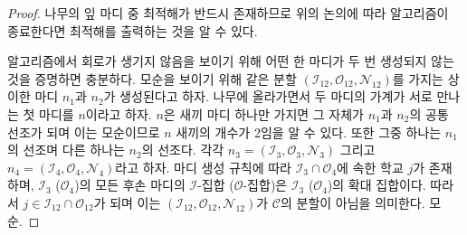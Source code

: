 \documentclass[11pt]{article} %
\newif\ifen
\theoremstyle{definition}
\theoremstyle{definition}
\begin{document}
\begin{proof}
\ifen
Because an optimal solution exists among the leaves of the tree, the discussion above implies that as long as the algorithm terminates, it returns an optimal solution.

To show that the algorithm does not cycle, it suffices to show that no node is generated twice. Suppose not: that two distinct nodes $n_1$ and $n_2$ share the same partition $(\mathcal{I}_{12}, \mathcal{O}_{12}, \mathcal{N}_{12})$. Trace each node's lineage up the tree and let $n$ denote the \emph{first} node at which the lineages meet. $n$ must have two children, or else its sole child is a common ancestor of $n_1$ and $n_2$, and one of these children, say $n_3$, must be an ancestor of $n_1$ while the other, say $n_4$, is an ancestor of $n_2$.  Write $n_3 = (\mathcal{I}_{3}, \mathcal{O}_{3}, \mathcal{N}_{3})$ and $n_4 = (\mathcal{I}_{4}, \mathcal{O}_{4}, \mathcal{N}_{4})$. By the node-generation rule, there is a school $j$ in $\mathcal{I}_3 \cap \mathcal{O}_4$, and the $\mathcal{I}$-set (respectively, $\mathcal{O}$-set) for any descendant of $\mathcal{I}_3$ (respectively, $\mathcal{O}_4$) is a superset of  $\mathcal{I}_3$ (respectively, $\mathcal{O}_4$). Therefore, $j \in \mathcal{I}_{12} \cap \mathcal{O}_{12}$, meaning that $(\mathcal{I}_{12}, \mathcal{O}_{12}, \mathcal{N}_{12})$ is not a partition of $\mathcal{C}$, a contradiction. 
\else
나무의 잎 마디 중 최적해가 반드시 존재하므로 위의 논의에 따라 알고리즘이 종료한다면 최적해를 출력하는 것을 알 수 있다.

알고리즘에서 회로가 생기지 않음을 보이기 위해 어떤 한 마디가 두 번 생성되지 않는 것을 증명하면 충분하다. 모순을 보이기 위해 같은 분할 $(\mathcal{I}_{12}, \mathcal{O}_{12}, \mathcal{N}_{12})$를 가지는 상이한 마디 $n_1$과 $n_2$가 생성된다고 하자. 나무에 올라가면서 두 마디의 가계가 서로 만나는 첫 마디를 $n$이라고 하자. $n$은 새끼 마디 하나만 가지면 그 자체가  $n_1$과 $n_2$의 공통 선조가 되며 이는 모순이므로 $n$ 새끼의 개수가 2임을 알 수 있다. 또한 그중 하나는 $n_1$의 선조며 다른 하나는 $n_2$의 선조다. 각각 $n_3 = (\mathcal{I}_{3}, \mathcal{O}_{3}, \mathcal{N}_{3})$ 그리고 $n_4 = (\mathcal{I}_{4}, \mathcal{O}_{4}, \mathcal{N}_{4})$라고 하자. 마디 생성 규칙에 따라 $\mathcal{I}_3 \cap \mathcal{O}_4$에 속한 학교 $j$가 존재하며,  $\mathcal{I}_3$ ($\mathcal{O}_4$)의 모든 후손 마디의 $\mathcal{I}$-집합 ($\mathcal{O}$-집합)은  $\mathcal{I}_3$ ($\mathcal{O}_4$)의 확대 집합이다. 따라서 $j \in \mathcal{I}_{12} \cap \mathcal{O}_{12}$가 되며 이는 $(\mathcal{I}_{12}, \mathcal{O}_{12}, \mathcal{N}_{12})$가 $\mathcal{C}$의 분할이 아님을 의미한다. 모순. 
\fi
\end{proof}
\end{document}
